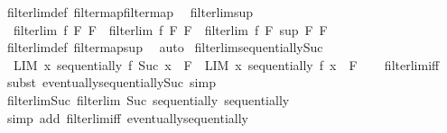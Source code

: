 \begin{isabellebody}
\ filterlim{\isacharunderscore}{\kern0pt}def\ filtermap{\isacharunderscore}{\kern0pt}filtermap\ \isacommand{{\isachardot}{\kern0pt}{\isachardot}{\kern0pt}}\isamarkupfalse%
%
\endisatagproof
{\isafoldproof}%
%
\isadelimproof
\isanewline
%
\endisadelimproof
\isanewline
{}\isamarkupfalse%
\ filterlim{\isacharunderscore}{\kern0pt}sup{\isacharcolon}{\kern0pt}\isanewline
\ \ {\isachardoublequoteopen}filterlim\ f\ F\ F{}\ {\isasymLongrightarrow}\ filterlim\ f\ F\ F{}\ {\isasymLongrightarrow}\ filterlim\ f\ F\ {\isacharparenleft}{\kern0pt}sup\ F{}\ F{}{\isacharparenright}{\kern0pt}{\isachardoublequoteclose}\isanewline
%
\isadelimproof
\ \ %
\endisadelimproof
%
\isatagproof
{}\isamarkupfalse%
\ filterlim{\isacharunderscore}{\kern0pt}def\ filtermap{\isacharunderscore}{\kern0pt}sup\ \isamarkupfalse%
\ auto%
\endisatagproof
{\isafoldproof}%
%
\isadelimproof
\isanewline
%
\endisadelimproof
\isanewline
{}\isamarkupfalse%
\ filterlim{\isacharunderscore}{\kern0pt}sequentially{\isacharunderscore}{\kern0pt}Suc{\isacharcolon}{\kern0pt}\isanewline
\ \ {\isachardoublequoteopen}{\isacharparenleft}{\kern0pt}LIM\ x\ sequentially{\isachardot}{\kern0pt}\ f\ {\isacharparenleft}{\kern0pt}Suc\ x{\isacharparenright}{\kern0pt}\ {\isacharcolon}{\kern0pt}{\isachargreater}{\kern0pt}\ F{\isacharparenright}{\kern0pt}\ {\isasymlongleftrightarrow}\ {\isacharparenleft}{\kern0pt}LIM\ x\ sequentially{\isachardot}{\kern0pt}\ f\ x\ {\isacharcolon}{\kern0pt}{\isachargreater}{\kern0pt}\ F{\isacharparenright}{\kern0pt}{\isachardoublequoteclose}\isanewline
%
\isadelimproof
\ \ %
\endisadelimproof
%
\isatagproof
{}\isamarkupfalse%
\ filterlim{\isacharunderscore}{\kern0pt}iff\ \isamarkupfalse%
\ {\isacharparenleft}{\kern0pt}subst\ eventually{\isacharunderscore}{\kern0pt}sequentially{\isacharunderscore}{\kern0pt}Suc{\isacharparenright}{\kern0pt}\ simp%
\endisatagproof
{\isafoldproof}%
%
\isadelimproof
\isanewline
%
\endisadelimproof
\isanewline
{}\isamarkupfalse%
\ filterlim{\isacharunderscore}{\kern0pt}Suc{\isacharcolon}{\kern0pt}\ {\isachardoublequoteopen}filterlim\ Suc\ sequentially\ sequentially{\isachardoublequoteclose}\isanewline
%
\isadelimproof
\ \ %
\endisadelimproof
%
\isatagproof
{}\isamarkupfalse%
\ {\isacharparenleft}{\kern0pt}simp\ add{\isacharcolon}{\kern0pt}\ filterlim{\isacharunderscore}{\kern0pt}iff\ eventually{\isacharunderscore}{\kern0pt}sequentially{\isacharparenright}{\kern0pt}%
\endisatagproof
{\isafoldproof}%

\end{isabellebody}
